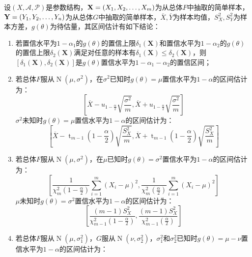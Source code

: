 \begin{theorem}
	设$(X,\mathscr{A},\mathscr{P})$是参数结构，$\mathbf{X}=(X_1, X_2, \dots, X_{m})$为从总体$F$中抽取的简单样本，$\mathbf{Y}=(Y_1, Y_2, \dots, Y_{n})$为从总体$G$中抽取的简单样本，$\overline{X},\overline{Y}$为样本均值，$S_X^2,S_Y^2$为样本方差，$g(\theta)$为待估量，其区间估计有如下结论：
	\begin{enumerate}
		\item 若置信水平为$1-\alpha_1$的$g(\theta)$的置信上限$\delta_1(\mathbf{X})$和置信水平为$1-\alpha_2$的$g(\theta)$的置信上限$\delta_2(\mathbf{X})$满足对任意的样本有$\delta_1(\mathbf{X})\leqslant\delta_2(\mathbf{X})$，则$[\delta_1(\mathbf{X}),\delta_2(\mathbf{X})]$是$g(\theta)$置信水平为$1-\alpha_1-\alpha_2$的置信区间；
		\item 若总体$F$服从$\operatorname{N}(\mu,\sigma^2)$，在$\sigma^2$已知时$g(\theta)=\mu$置信水平为$1-\alpha$的区间估计为：
		\begin{equation*}
			\left[\overline{X}-u_{1-\frac{\alpha}{2}}\sqrt{\dfrac{\sigma^2}{m}},\overline{X}+u_{1-\frac{\alpha}{2}}\sqrt{\dfrac{\sigma^2}{m}}\right]
		\end{equation*}
		$\sigma^2$未知时$g(\theta)=\mu$置信水平为$1-\alpha$的区间估计为：
		\begin{equation*}
			\left[\overline{X}-\operatorname{t}_{m-1}\left(1-\frac{\alpha}{2}\right)\sqrt{\dfrac{S_X^2}{m}},\overline{X}+\operatorname{t}_{m-1}\left(1-\frac{\alpha}{2}\right)\sqrt{\dfrac{S_X^2}{m}}\right]
		\end{equation*}
		\item 若总体$F$服从$\operatorname{N}(\mu,\sigma^2)$，在$\mu$已知时$g(\theta)=\sigma^2$置信水平为$1-\alpha$的区间估计为：
		\begin{equation*}
			\left[\frac{1}{\chi_{m}^2\left(1-\frac{\alpha}{2}\right)}\sum_{i=1}^{m}(X_i-\mu)^2,\frac{1}{\chi_{m}^2\left(\frac{\alpha}{2}\right)}\sum_{i=1}^{m}(X_i-\mu)^2\right]
		\end{equation*}
		$\mu$未知时$g(\theta)=\sigma^2$置信水平为$1-\alpha$的区间估计为：
		\begin{equation*}
			\left[\frac{(m-1)S_X^2}{\chi_{m-1}^2\left(1-\frac{\alpha}{2}\right)},\frac{(m-1)S_X^2}{\chi_{m-1}^2\left(\frac{\alpha}{2}\right)}\right]
		\end{equation*}
		\item 若总体$F$服从$\operatorname{N}(\mu,\sigma_1^2)$，$G$服从$\operatorname{N}(\nu,\sigma_2^2)$，$\sigma_1^2$和$\sigma_2^2$已知时$g(\theta)=\mu-\nu$置信水平为$1-\alpha$的区间估计为：
		\begin{equation*}

\end{equation*}
\end{enumerate}
\end{theorem}
